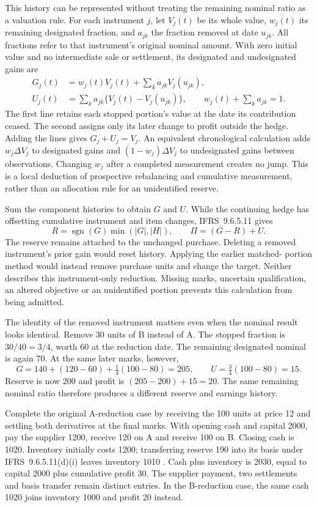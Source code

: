 This history can be represented without treating the remaining nominal ratio
as a valuation rule. For each instrument \(j\), let \(V_j(t)\) be its whole
value, \(w_j(t)\) its remaining designated fraction, and \(a_{jk}\) the
fraction removed at date \(u_{jk}\). All fractions refer to that instrument's
original nominal amount. With zero initial value and no intermediate sale or
settlement, its designated and undesignated gains are
\[
 \begin{aligned}
 G_j(t)&=w_j(t)V_j(t)+\sum_k a_{jk}V_j(u_{jk}),\\
 U_j(t)&=\sum_k a_{jk}\{V_j(t)-V_j(u_{jk})\},\qquad
 w_j(t)+\sum_k a_{jk}=1.
 \end{aligned}
\]
The first line retains each stopped portion's value at the date its contribution
ceased. The second assigns only its later change to profit outside the hedge.
Adding the lines gives \(G_j+U_j=V_j\). An equivalent chronological calculation
adds \(w_j\Delta V_j\) to designated gains and
\((1-w_j)\Delta V_j\) to undesignated gains between observations. Changing
\(w_j\) after a completed measurement creates no jump. This is a local
deduction of prospective rebalancing and cumulative measurement, rather than
an allocation rule for an unidentified reserve.

Sum the component histories to obtain \(G\) and \(U\). While the continuing
hedge has offsetting cumulative instrument and item changes, IFRS~9.6.5.11 gives
\[
 R=\operatorname{sgn}(G)\min(|G|,|H|),\qquad
 \Pi=(G-R)+U.
\]
The reserve remains attached to the unchanged purchase. Deleting a removed
instrument's prior gain would reset history. Applying the earlier matched-
portion method would instead remove purchase units and change the target.
Neither describes this instrument-only reduction. Missing marks, uncertain
qualification, an altered objective or an unidentified portion prevents this
calculation from being admitted.

The identity of the removed instrument matters even when the nominal result
looks identical. Remove 30 units of B instead of A. The stopped fraction is
\(30/40=3/4\), worth 60 at the reduction date. The remaining designated
nominal is again 70. At the same later marks, however,
\[
 G=140+(120-60)+\tfrac14(100-80)=205,\qquad
 U=\tfrac34(100-80)=15.
\]
Reserve is now 200 and profit is \((205-200)+15=20\). The same remaining
nominal ratio therefore produces a different reserve and earnings history.

Complete the original A-reduction case by receiving the 100 units at price 12
and settling both derivatives at the final marks. With opening cash and capital
2000, pay the supplier 1200, receive 120 on A and receive 100 on B. Closing cash
is 1020. Inventory initially costs 1200; transferring reserve 190 into its
basis under IFRS~9.6.5.11(d)(i) leaves inventory 1010
\citep[IFRS~9.6.5.11]{eu20231803}. Cash plus inventory is 2030, equal to capital
2000 plus cumulative profit 30. The supplier payment, two settlements and basis
transfer remain distinct entries. In the B-reduction case, the same cash 1020
joins inventory 1000 and profit 20 instead.

